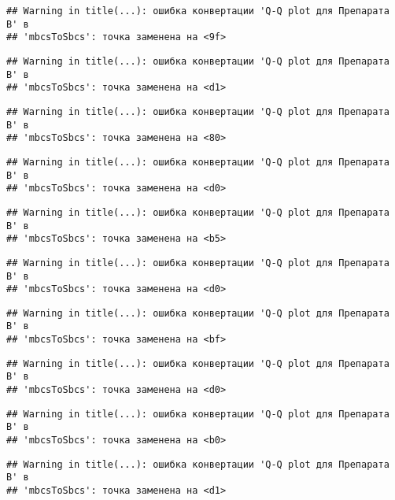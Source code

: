 \documentclass[
]{article}
\begin{document}
\begin{verbatim}
## Warning in title(...): ошибка конвертации 'Q-Q plot для Препарата В' в
## 'mbcsToSbcs': точка заменена на <9f>
\end{verbatim}

\begin{verbatim}
## Warning in title(...): ошибка конвертации 'Q-Q plot для Препарата В' в
## 'mbcsToSbcs': точка заменена на <d1>
\end{verbatim}

\begin{verbatim}
## Warning in title(...): ошибка конвертации 'Q-Q plot для Препарата В' в
## 'mbcsToSbcs': точка заменена на <80>
\end{verbatim}

\begin{verbatim}
## Warning in title(...): ошибка конвертации 'Q-Q plot для Препарата В' в
## 'mbcsToSbcs': точка заменена на <d0>
\end{verbatim}

\begin{verbatim}
## Warning in title(...): ошибка конвертации 'Q-Q plot для Препарата В' в
## 'mbcsToSbcs': точка заменена на <b5>
\end{verbatim}

\begin{verbatim}
## Warning in title(...): ошибка конвертации 'Q-Q plot для Препарата В' в
## 'mbcsToSbcs': точка заменена на <d0>
\end{verbatim}

\begin{verbatim}
## Warning in title(...): ошибка конвертации 'Q-Q plot для Препарата В' в
## 'mbcsToSbcs': точка заменена на <bf>
\end{verbatim}

\begin{verbatim}
## Warning in title(...): ошибка конвертации 'Q-Q plot для Препарата В' в
## 'mbcsToSbcs': точка заменена на <d0>
\end{verbatim}

\begin{verbatim}
## Warning in title(...): ошибка конвертации 'Q-Q plot для Препарата В' в
## 'mbcsToSbcs': точка заменена на <b0>
\end{verbatim}

\begin{verbatim}
## Warning in title(...): ошибка конвертации 'Q-Q plot для Препарата В' в
## 'mbcsToSbcs': точка заменена на <d1>
\end{verbatim}
\end{document}

